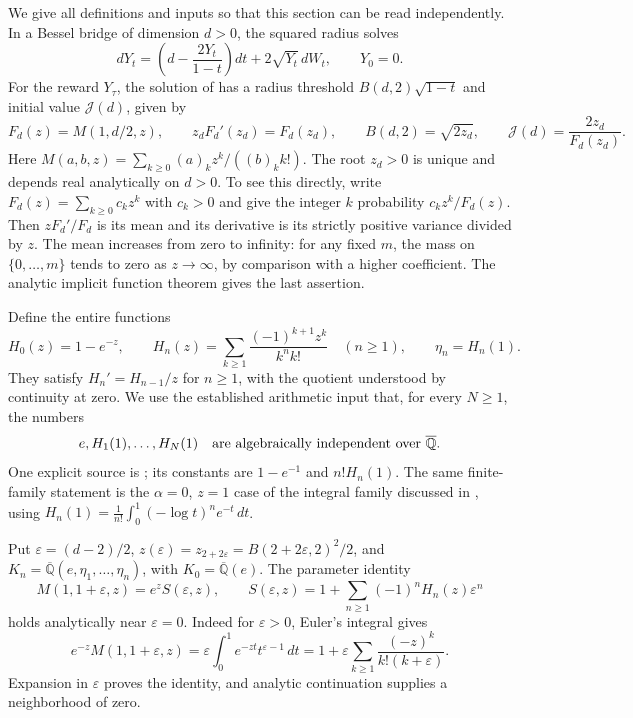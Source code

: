 \documentclass[11pt,a4paper]{article}
\theoremstyle{definition}
\theoremstyle{remark}
\numberwithin{equation}{section}
\begin{document}
We give all definitions and inputs so that this section can be read
independently. In a Bessel bridge of dimension $d>0$, the squared radius
solves
\[
 dY_t=\left(d-\frac{2Y_t}{1-t}\right)dt+2\sqrt{Y_t}\,dW_t,
 \qquad Y_0=0.
\]
For the reward $Y_\tau$, the solution of
\cite[Theorem~3.1]{p2:HobsonLiu2026} has a radius threshold
$B(d,2)\sqrt{1-t}$ and initial value $\mathcal J(d)$, given by
\begin{equation}\label{p2:eq:round2-bessel-definitions}
 F_d(z)=M(1,d/2,z),\qquad
 z_dF_d'(z_d)=F_d(z_d),\qquad
 B(d,2)=\sqrt{2z_d},\qquad
 \mathcal J(d)=\frac{2z_d}{F_d(z_d)}.
\end{equation}
Here $M(a,b,z)=\sum_{k\geq0}(a)_kz^k/((b)_k k!)$.
The root $z_d>0$ is unique and depends real analytically on $d>0$.
To see this directly, write $F_d(z)=\sum_{k\geq0}c_kz^k$ with
$c_k>0$ and give the integer $k$ probability $c_kz^k/F_d(z)$.
Then $zF_d'/F_d$ is its mean and its derivative is its strictly
positive variance divided by $z$. The mean increases from zero to
infinity: for any fixed $m$, the mass on $\{0,\ldots,m\}$ tends to
zero as $z\to\infty$, by comparison with a higher coefficient.
The analytic implicit function theorem gives the last assertion.

Define the entire functions
\[
 H_0(z)=1-e^{-z},\qquad
 H_n(z)=\sum_{k\geq1}\frac{(-1)^{k+1}z^k}{k^n k!}\quad(n\geq1),
 \qquad \eta_n=H_n(1).
\]
They satisfy $H_n'=H_{n-1}/z$ for $n\geq1$, with the quotient
understood by continuity at zero. We use the established arithmetic
input that, for every $N\geq1$, the numbers
\begin{equation}\label{p2:eq:round2-known-independent-constants}
 e,H_1(1),\ldots,H_N(1)
 \quad\hbox{are algebraically independent over }\overline{\mathbb Q}.
\end{equation}
One explicit source is \cite[Theorem~2]{p2:Powers2026}; its constants
are $1-e^{-1}$ and $n!H_n(1)$. The same finite-family statement is
the $\alpha=0$, $z=1$ case of the integral family discussed in
\cite[Section~7]{p2:Rivoal2012}, using
$H_n(1)=\frac1{n!}\int_0^1(-\log t)^n e^{-t}\,dt$.

Put $\varepsilon=(d-2)/2$,
$z(\varepsilon)=z_{2+2\varepsilon}=B(2+2\varepsilon,2)^2/2$, and
$K_n=\overline{\mathbb Q}(e,\eta_1,\ldots,\eta_n)$, with
$K_0=\overline{\mathbb Q}(e)$. The parameter identity
\begin{equation}\label{p2:eq:round2-parameter-identity}
 M(1,1+\varepsilon,z)=e^z S(\varepsilon,z),\qquad
 S(\varepsilon,z)=1+\sum_{n\geq1}(-1)^nH_n(z)\varepsilon^n
\end{equation}
holds analytically near $\varepsilon=0$. Indeed for
$\varepsilon>0$, Euler's integral gives
\[
 e^{-z}M(1,1+\varepsilon,z)
 =\varepsilon\int_0^1 e^{-zt}t^{\varepsilon-1}\,dt
 =1+\varepsilon\sum_{k\geq1}\frac{(-z)^k}{k!(k+\varepsilon)}.
\]
Expansion in $\varepsilon$ proves the identity, and analytic
continuation supplies a neighborhood of zero.
\end{document}
